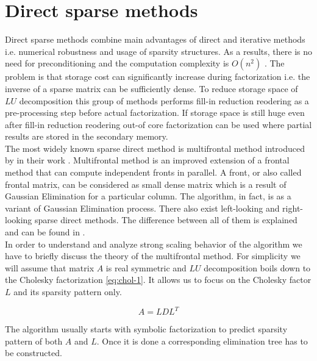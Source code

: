 \section{Direct sparse methods}
\label{subseq:sparse methods}

Direct sparse methods combine main advantages of direct and iterative methods i.e. numerical robustness and usage of sparsity structures. As a results, there is no need for preconditioning and the computation complexity is $O(n^2)$ \cite{complexity-of-spdm}. The problem is that storage cost can significantly increase during factorization i.e. the inverse of a sparse matrix can be sufficiently dense. To reduce storage space of $LU$ decomposition this group of methods performs fill-in reduction reodering as a pre-processing step before actual factorization. If storage space is still huge even after fill-in reduction reodering out-of core factorization can be used where partial results are stored in the secondary memory. \\

The most widely known sparse direct method is multifrontal method introduced by \citeauthor{mult-frontal-original:1} in their work \cite{mult-frontal-original:1}. Multifrontal method is an improved extension of a frontal method \cite{frontal-original} that can compute independent fronts in parallel. A front, or also called frontal matrix, can be considered as small dense matrix which is a result of Gaussian Elimination for a particular column. The algorithm, in fact, is as a variant of Gaussian Elimination process. There also exist left-looking and right-looking sparse direct methods. The difference between all of them is explained and can be found in \cite{elimination-tree}.\\


In order to understand and analyze strong scaling behavior of the algorithm we have to briefly discuss the theory of the multifrontal method. For simplicity we will assume that matrix $A$ is real symmetric and $LU$ decomposition boils down to the Cholesky factorization \ref{eq:chol-1}. It allows us to focus on the Cholesky factor $L$ and its sparsity pattern only.

\begin{equation} \label{eq:chol-1}
	A = LDL^T
\end{equation}

The algorithm usually starts with symbolic factorization to predict sparsity pattern of both $A$ and $L$. Once it is done a corresponding elimination tree has to be constructed.\\


